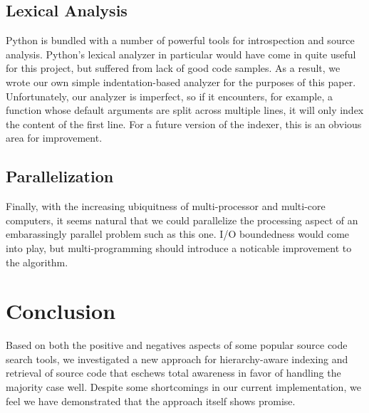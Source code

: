 \documentclass{article}
\begin{document}
\subsection{Lexical Analysis}
Python is bundled with a number of powerful tools for introspection and source analysis. Python's lexical analyzer in particular would have come in quite useful for this project, but suffered from lack of good code samples. As a result, we wrote our own simple indentation-based analyzer for the purposes of this paper.
Unfortunately, our analyzer is imperfect, so if it encounters, for example, a function whose default arguments are split across multiple lines, it will only index the content of the first line. For a future version of the indexer, this is an obvious area for improvement.

\subsection{Parallelization}
Finally, with the increasing ubiquitness of multi-processor and multi-core computers, it seems natural that we could parallelize the processing aspect of an embarassingly parallel problem such as this one. I/O boundedness would come into play, but multi-programming should introduce a noticable improvement to the algorithm.

\section{Conclusion}
Based on both the positive and negatives aspects of some popular source code search tools, we investigated a new approach for hierarchy-aware indexing and retrieval of source code that eschews total awareness in favor of handling the majority case well. Despite some shortcomings in our current implementation, we feel we have demonstrated that the approach itself shows promise.

\pagebreak
\end{document}

